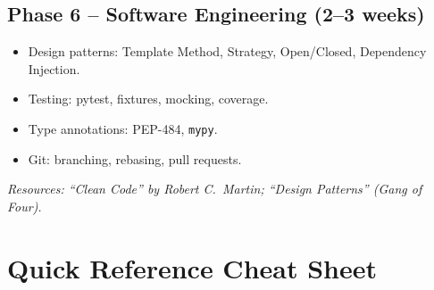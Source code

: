 \documentclass[12pt,a4paper,oneside]{book}
\begin{document}
\section{Phase 6 -- Software Engineering (2--3 weeks)}
\begin{itemize}
  \item Design patterns: Template Method, Strategy, Open/Closed, Dependency Injection.
  \item Testing: pytest, fixtures, mocking, coverage.
  \item Type annotations: PEP-484, \texttt{mypy}.
  \item Git: branching, rebasing, pull requests.
\end{itemize}
\textit{Resources: ``Clean Code'' by Robert C.\ Martin; ``Design Patterns'' (Gang of Four).}

\chapter{Quick Reference Cheat Sheet}\label{chap:cheatsheet}
\end{document}

